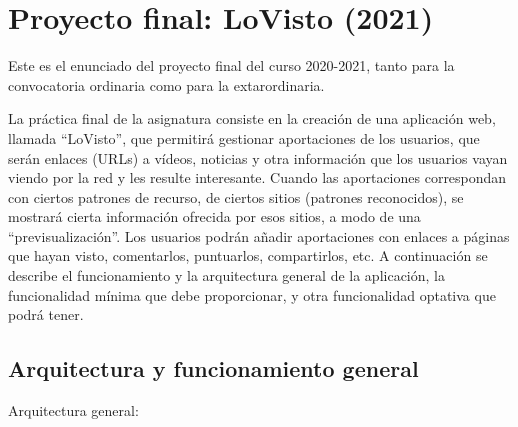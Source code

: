 \section{Proyecto final: LoVisto (2021)}
\label{practica-final-2021-05}


Este es el enunciado del proyecto final del curso 2020-2021, tanto para la convocatoria ordinaria como para la extarordinaria.

La práctica final de la asignatura consiste en la creación de una aplicación web, llamada ``LoVisto'', que permitirá gestionar aportaciones de los usuarios, que serán enlaces (URLs) a vídeos, noticias y otra información que los usuarios vayan viendo por la red y les resulte interesante. Cuando las aportaciones correspondan con ciertos patrones de recurso, de ciertos sitios (patrones reconocidos), se mostrará cierta información ofrecida por esos sitios, a modo de una ``previsualización''. Los usuarios podrán añadir aportaciones con enlaces a páginas que hayan visto, comentarlos, puntuarlos, compartirlos, etc. A continuación se describe el funcionamiento y la arquitectura general de la aplicación, la funcionalidad mínima que debe proporcionar, y otra funcionalidad optativa que podrá tener.

\subsection{Arquitectura y funcionamiento general}

Arquitectura general:

